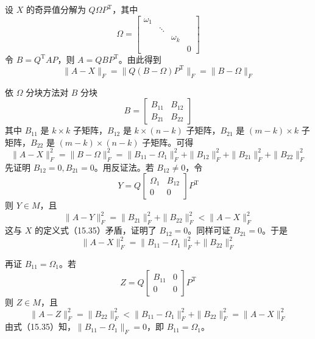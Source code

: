 \documentclass[UTF8, 12pt, fontset=fandol, oneside]{ctexart}
\begin{document}
设 $X$ 的奇异值分解为 $Q\Omega P^{\mathrm{T}}$，其中
\[
\Omega=
\begin{bmatrix}
\omega_1&&&\\
&\ddots&&\\
&&\omega_k&\\
&&&0
\end{bmatrix}
\]
令 $B=Q^{\mathrm{T}}AP$，则 $A=QBP^{\mathrm{T}}$。由此得到
\begin{equation}
\|A-X\|_F=\|Q(B-\Omega)P^{\mathrm{T}}\|_F=\|B-\Omega\|_F
\tag{15.36}
\end{equation}

依 $\Omega$ 分块方法对 $B$ 分块
\[
B=
\begin{bmatrix}
B_{11}&B_{12}\\
B_{21}&B_{22}
\end{bmatrix}
\]
其中 $B_{11}$ 是 $k\times k$ 子矩阵，$B_{12}$ 是 $k\times(n-k)$ 子矩阵，$B_{21}$ 是 $(m-k)\times k$ 子矩阵，$B_{22}$ 是 $(m-k)\times(n-k)$ 子矩阵。可得
\begin{equation}
\|A-X\|_F^2=\|B-\Omega\|_F^2
=\|B_{11}-\Omega_1\|_F^2+\|B_{12}\|_F^2+\|B_{21}\|_F^2+\|B_{22}\|_F^2
\tag{15.37}
\end{equation}
先证明 $B_{12}=0,B_{21}=0$。用反证法。若 $B_{12}\neq0$，令
\[
Y=Q
\begin{bmatrix}
\Omega_1&B_{12}\\
0&0
\end{bmatrix}
P^{\mathrm{T}}
\]
则 $Y\in M$，且
\begin{equation}
\|A-Y\|_F^2=\|B_{21}\|_F^2+\|B_{22}\|_F^2<\|A-X\|_F^2
\tag{15.38}
\end{equation}
这与 $X$ 的定义式（15.35）矛盾，证明了 $B_{12}=0$。同样可证 $B_{21}=0$。于是
\begin{equation}
\|A-X\|_F^2=\|B_{11}-\Omega_1\|_F^2+\|B_{22}\|_F^2
\tag{15.39}
\end{equation}

再证 $B_{11}=\Omega_1$。若
\[
Z=Q
\begin{bmatrix}
B_{11}&0\\
0&0
\end{bmatrix}
P^{\mathrm{T}}
\]
则 $Z\in M$，且
\begin{equation}
\|A-Z\|_F^2=\|B_{22}\|_F^2<\|B_{11}-\Omega_1\|_F^2+\|B_{22}\|_F^2=\|A-X\|_F^2
\tag{15.40}
\end{equation}
由式（15.35）知，$\|B_{11}-\Omega_1\|_F=0$，即 $B_{11}=\Omega_1$。
\end{document}
